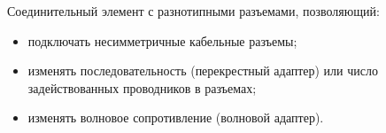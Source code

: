 Соединительный элемент с разнотипными
разъемами, позволяющий:
\begin{itemize}
    \item подключать несимметричные кабельные разъемы;
    \item изменять последовательность (перекрестный адаптер) или число задействованных проводников в разъемах;
    \item изменять волновое сопротивление (волновой адаптер).
\end{itemize}